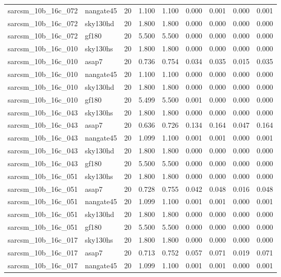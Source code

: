 \begin{tabular}{llrrrrrrr}
sarcsm\_10b\_16c\_072 & nangate45 & 20 & 1.100 & 1.100 & 0.000 & 0.001 & 0.000 & 0.001 \\
sarcsm\_10b\_16c\_072 & sky130hd & 20 & 1.800 & 1.800 & 0.000 & 0.000 & 0.000 & 0.000 \\
sarcsm\_10b\_16c\_072 & gf180 & 20 & 5.500 & 5.500 & 0.000 & 0.000 & 0.000 & 0.000 \\
sarcsm\_10b\_16c\_010 & sky130hs & 20 & 1.800 & 1.800 & 0.000 & 0.000 & 0.000 & 0.000 \\
sarcsm\_10b\_16c\_010 & asap7 & 20 & 0.736 & 0.754 & 0.034 & 0.035 & 0.015 & 0.035 \\
sarcsm\_10b\_16c\_010 & nangate45 & 20 & 1.100 & 1.100 & 0.000 & 0.000 & 0.000 & 0.000 \\
sarcsm\_10b\_16c\_010 & sky130hd & 20 & 1.800 & 1.800 & 0.000 & 0.000 & 0.000 & 0.000 \\
sarcsm\_10b\_16c\_010 & gf180 & 20 & 5.499 & 5.500 & 0.001 & 0.000 & 0.000 & 0.000 \\
sarcsm\_10b\_16c\_043 & sky130hs & 20 & 1.800 & 1.800 & 0.000 & 0.000 & 0.000 & 0.000 \\
sarcsm\_10b\_16c\_043 & asap7 & 20 & 0.636 & 0.726 & 0.134 & 0.164 & 0.047 & 0.164 \\
sarcsm\_10b\_16c\_043 & nangate45 & 20 & 1.099 & 1.100 & 0.001 & 0.001 & 0.000 & 0.001 \\
sarcsm\_10b\_16c\_043 & sky130hd & 20 & 1.800 & 1.800 & 0.000 & 0.000 & 0.000 & 0.000 \\
sarcsm\_10b\_16c\_043 & gf180 & 20 & 5.500 & 5.500 & 0.000 & 0.000 & 0.000 & 0.000 \\
sarcsm\_10b\_16c\_051 & sky130hs & 20 & 1.800 & 1.800 & 0.000 & 0.000 & 0.000 & 0.000 \\
sarcsm\_10b\_16c\_051 & asap7 & 20 & 0.728 & 0.755 & 0.042 & 0.048 & 0.016 & 0.048 \\
sarcsm\_10b\_16c\_051 & nangate45 & 20 & 1.099 & 1.100 & 0.001 & 0.001 & 0.000 & 0.001 \\
sarcsm\_10b\_16c\_051 & sky130hd & 20 & 1.800 & 1.800 & 0.000 & 0.000 & 0.000 & 0.000 \\
sarcsm\_10b\_16c\_051 & gf180 & 20 & 5.500 & 5.500 & 0.000 & 0.000 & 0.000 & 0.000 \\
sarcsm\_10b\_16c\_017 & sky130hs & 20 & 1.800 & 1.800 & 0.000 & 0.000 & 0.000 & 0.000 \\
sarcsm\_10b\_16c\_017 & asap7 & 20 & 0.713 & 0.752 & 0.057 & 0.071 & 0.019 & 0.071 \\
sarcsm\_10b\_16c\_017 & nangate45 & 20 & 1.099 & 1.100 & 0.001 & 0.001 & 0.000 & 0.001 \\

\end{tabular}
